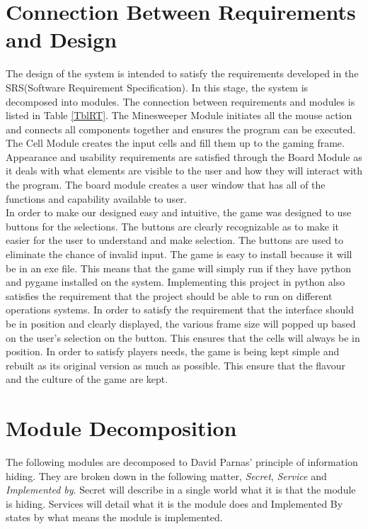 \documentclass[12pt, titlepage]{article}
\begin{document}
\section{Connection Between Requirements and Design} \label{SecConnection}
The design of the system is intended to satisfy the requirements developed in the SRS(Software Requirement Specification). In this stage, the system is decomposed into modules. The connection between requirements and modules is listed in Table \ref{TblRT}. The Minesweeper Module initiates all the mouse action and connects all components together and ensures the program can be executed. The Cell Module creates the input cells and fill them up to the gaming frame. Appearance and usability requirements are satisfied through the Board Module as it deals with what elements are visible to the user and how they will interact with the program. The board module creates a user window that has all of the functions and capability available to user. \\
In order to make our designed easy and intuitive, the game was designed to use buttons for the selections. The buttons are clearly recognizable as to make it easier for the user to understand and make selection. The buttons are used to eliminate the chance of invalid input. The game is easy to install because it will be in an exe file. This means that the game will simply run if they have python and pygame installed on the system. Implementing this project in python also satisfies the requirement that the project should be able to run on different operations systems. In order to satisfy the requirement that the interface should be in position and clearly displayed, the various frame size will popped up based on the user's selection on the button. This ensures that the cells will always be in position. In order to satisfy players needs, the game is being kept simple and rebuilt as its original version as much as possible. This ensure that the flavour and the culture of the game are kept.
\section{Module Decomposition} \label{SecMD}
The following modules are decomposed to David Parnas' principle of information hiding. They are broken down in the following matter, \emph{Secret}, \emph{Service} and \emph{Implemented by}. Secret will describe in a single world what it is that the module is hiding. Services will detail what it is the module does and Implemented By states by what means the module is implemented.
\end{document}
